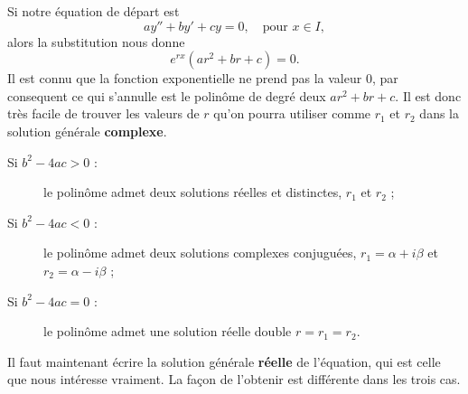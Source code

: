 Si notre équation de départ est 
\begin{equation}\label{eq_lin_ordre_deux_hom}
  ay'' + by' + cy = 0, \quad\text{pour } x\in I, 
\end{equation}
alors la substitution nous donne
\[
e^{rx}\left(ar^2+br+c\right)=0.
\]
Il est connu que la fonction exponentielle ne prend pas la valeur $0$, par consequent ce qui s'annulle est le polin\^ome de degré deux $ar^2+br+c$. Il est donc très facile de trouver les valeurs de $r$ qu'on pourra utiliser comme $r_1$ et $r_2$ dans la solution générale \textbf{complexe}.
\begin{description}
  \item[Si $b^2 - 4ac >0$ :] le polin\^ome admet deux solutions réelles et distinctes, $r_1$ et $r_2$ ;
  \item[Si $b^2 - 4ac <0$ :] le polin\^ome admet deux solutions complexes conjuguées, $r_1 = \alpha + i \beta$ et $r_2 = \alpha - i \beta$ ;
  \item[Si $b^2 - 4ac =0$ :] le polin\^ome admet une solution réelle double $r=r_1 = r_2$.
\end{description}
Il faut maintenant écrire la solution générale \textbf{réelle} de l'équation, qui est celle que nous intéresse vraiment. La façon de l'obtenir est différente dans les trois cas.
